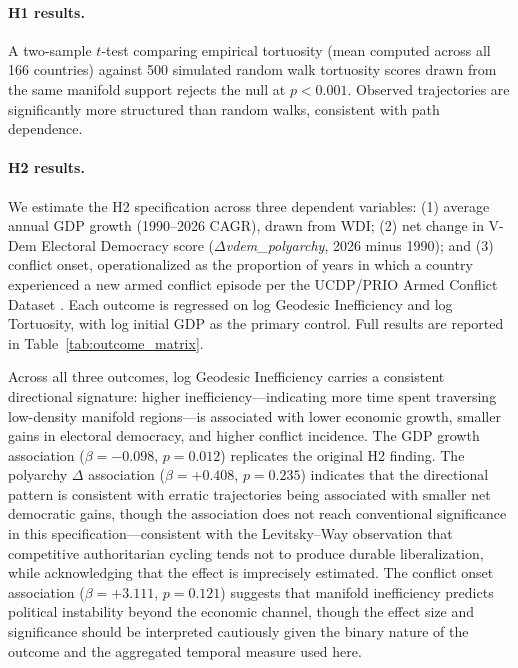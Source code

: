 \documentclass[12pt]{article}
\begin{document}
\paragraph{H1 results.} A two-sample $t$-test comparing empirical tortuosity (mean computed across all 166 countries) against 500 simulated random walk tortuosity scores drawn from the same manifold support rejects the null at $p < 0.001$. Observed trajectories are significantly more structured than random walks, consistent with path dependence.

\paragraph{H2 results.} We estimate the H2 specification across three dependent variables: (1) average annual GDP growth (1990--2026 CAGR), drawn from WDI; (2) net change in V-Dem Electoral Democracy score ($\Delta$\textit{vdem\_polyarchy}, 2026 minus 1990); and (3) conflict onset, operationalized as the proportion of years in which a country experienced a new armed conflict episode per the UCDP/PRIO Armed Conflict Dataset \cite{gleditsch2002armed}. Each outcome is regressed on log Geodesic Inefficiency and log Tortuosity, with log initial GDP as the primary control. Full results are reported in Table~\ref{tab:outcome_matrix}.

Across all three outcomes, log Geodesic Inefficiency carries a consistent directional signature: higher inefficiency—indicating more time spent traversing low-density manifold regions—is associated with lower economic growth, smaller gains in electoral democracy, and higher conflict incidence. The GDP growth association ($\beta = -0.098$, $p = 0.012$) replicates the original H2 finding. The polyarchy $\Delta$ association ($\beta = +0.408$, $p = 0.235$) indicates that the directional pattern is consistent with erratic trajectories being associated with smaller net democratic gains, though the association does not reach conventional significance in this specification---consistent with the Levitsky--Way observation that competitive authoritarian cycling tends not to produce durable liberalization, while acknowledging that the effect is imprecisely estimated. The conflict onset association ($\beta = +3.111$, $p = 0.121$) suggests that manifold inefficiency predicts political instability beyond the economic channel, though the effect size and significance should be interpreted cautiously given the binary nature of the outcome and the aggregated temporal measure used here.
\end{document}
